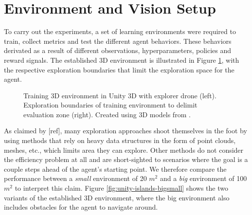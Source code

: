 \section{Environment and Vision Setup}\label{chap:4:setup}



To carry out the experiments, a set of learning environments were required to train, collect metrics and test the different agent behaviors. These behaviors derivated as a result of different observations, hyperparameters, policies and reward signals. The established 3D environment is illustrated in Figure \ref{fig:unity-island}, with the respective exploration boundaries that limit the exploration space for the agent.

\begin{figure}[!ht]
    \centering
    \caption{Training 3D environment in Unity 3D with explorer drone (left). Exploration boundaries of training environment to delimit evaluation zone (right). Created using 3D models from \cite{unity-asset-store}.}
    \label{fig:unity-island}
\end{figure}

As claimed by [ref], many exploration approaches shoot themselves in the foot by using methods that rely on heavy data structures in the form of point clouds, meshes, etc., which limits area they can explore. Other methods do not consider the efficiency problem at all and are short-sighted to scenarios where the goal is a couple steps ahead of the agent's starting point. We therefore compare the performance between a \textit{small} environment of 20 $m^2$ and a \textit{big} environment of 100 $m^2$ to interpret this claim. Figure \ref{fig:unity-islands-bigsmall} shows the two variants of the established 3D environment, where the big environment also includes obstacles for the agent to navigate around.



